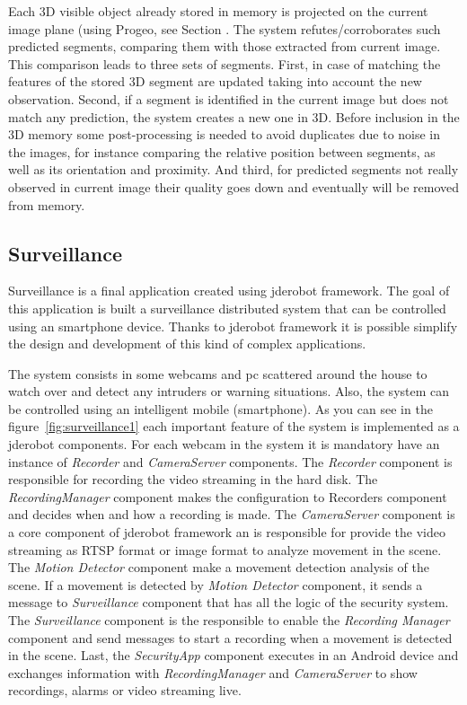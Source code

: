 \documentclass[twocolumn]{svjour3}          %
\begin{document}
Each 3D visible object already stored in memory is projected on the current image plane (using Progeo, see Section \label{subsec:progeo}. The system refutes/corroborates such predicted segments, comparing them with those extracted from current image. This comparison leads to three sets of segments. First, in case of matching the features of the stored 3D segment are updated taking into account the new observation. Second, if a segment is identified in the current image but does not match any prediction, the system creates a new one in 3D. Before inclusion in the 3D memory some post-processing is needed to avoid duplicates due to noise in the images, for instance comparing the relative position between segments, as well as its orientation and proximity. And third, for predicted segments not really observed in current image their quality goes down and eventually will be removed from memory.

\subsection{Surveillance}

Surveillance is a final application created using jderobot
framework. The goal of this application is built a surveillance
distributed system that can be controlled using an smartphone
device. Thanks to jderobot framework it is possible simplify the design
and development of this kind of complex applications.

The system consists in some webcams and pc scattered around the house
to watch over and detect any intruders or warning situations. Also, the
system can be controlled using an intelligent mobile (smartphone). As
you can see in the figure~\ref{fig:surveillance1} each important
feature of the system is implemented as a jderobot components. For each
webcam in the system it is mandatory have an instance of \emph{Recorder} and
\emph{CameraServer} components. The \emph{Recorder} component is
responsible for recording the video streaming in the hard disk. The
\emph{RecordingManager} component makes the configuration to
{Recorders} component and decides when and how a recording is
made. The \emph{CameraServer} component is a core component of
jderobot framework an is responsible for provide the video streaming as
RTSP format or image format to analyze movement in the scene. The \emph{Motion
  Detector} component make a movement detection analysis of the
scene. If a movement is detected by \emph{Motion Detector} component, it
sends a message to \emph{Surveillance} component that has all the logic of
the security system. The \emph{Surveillance} component is the responsible to
enable the \emph{Recording Manager} component and send messages to
start a recording when a movement is detected in the scene. Last, the
\emph{SecurityApp} component executes in an Android device and
exchanges information with \emph{RecordingManager} and
\emph{CameraServer} to show recordings, alarms or video streaming live.
\end{document}
